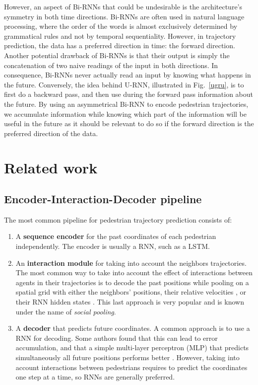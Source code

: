 \documentclass[conference]{IEEEtran}
\begin{document}
However, an aspect of Bi-RNNs that could be undesirable is the architecture's symmetry in both time directions. Bi-RNNs are often used in natural language processing, where the order of the words is almost exclusively determined by grammatical rules and not by temporal sequentiality. However, in trajectory prediction, the data has a preferred direction in time: the forward direction. Another potential drawback of Bi-RNNs is that their output is simply the concatenation of two naive readings of the input in both directions. In consequence, Bi-RNNs never actually read an input by knowing what happens in the future. Conversely, the idea behind U-RNN, illustrated in Fig.~\ref{ugru}, is to first do a backward pass, and then use during the forward pass information about the future. By using an asymmetrical Bi-RNN to encode pedestrian trajectories, we accumulate information while knowing which part of the information will be useful in the future as it should be relevant to do so if the forward direction is the preferred direction of the data.







\section{Related work}

\subsection{Encoder-Interaction-Decoder pipeline}

The most common pipeline for pedestrian trajectory prediction consists of:

\begin{enumerate}
    \item A \textbf{sequence encoder} for the past coordinates of each pedestrian independently.  The encoder is usually a RNN, such as a LSTM.
    \item An \textbf{interaction module} for taking into account the neighbors trajectories. The most common way to take into account the effect of interactions between agents in their trajectories is to decode the past positions while pooling on a spatial grid with either the neighbors' positions, their relative velocities \cite{kothari_human_2021}, or their RNN hidden states \cite{alahi_social_2016}. This last approach is very popular and is known under the name of \textit{social pooling}. 
    \item A \textbf{decoder} that predicts future coordinates. A common approach is to use a RNN for decoding. Some authors found that this can lead to error accumulation, and that a simple multi-layer perceptron (MLP) that predicts simultaneously all future positions performs better \cite{leal-taixe_red_2019}. However, taking into account interactions between pedestrians requires to predict the coordinates one step at a time, so RNNs are generally preferred.
\end{enumerate}
\end{document}
